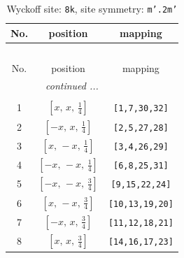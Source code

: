 \documentclass[fleqn,8pt]{jsarticle}
\begin{document}
\begin{longtable}{ccc}
\caption{Wyckoff site: {\tt 8k}, site symmetry: {\tt m'.2m'}}
 \\
 \hline \hline
No. & position & mapping \\ \hline \endfirsthead

\multicolumn{2}{l}{\tablename\ \thetable{}} \\
 \hline \hline
No. & position & mapping \\ \hline \endhead

 \hline \hline
\multicolumn{2}{r}{\footnotesize\it continued ...} \\ \endfoot

 \hline \hline
\multicolumn{2}{r}{} \\ \endlastfoot

1 & $\left[ x,\, x,\, \frac{1}{4} \right]$ & {\tt [1,7,30,32]} \\ \hline
2 & $\left[ - x,\, x,\, \frac{1}{4} \right]$ & {\tt [2,5,27,28]} \\ \hline
3 & $\left[ x,\, - x,\, \frac{1}{4} \right]$ & {\tt [3,4,26,29]} \\ \hline
4 & $\left[ - x,\, - x,\, \frac{1}{4} \right]$ & {\tt [6,8,25,31]} \\ \hline
5 & $\left[ - x,\, - x,\, \frac{3}{4} \right]$ & {\tt [9,15,22,24]} \\ \hline
6 & $\left[ x,\, - x,\, \frac{3}{4} \right]$ & {\tt [10,13,19,20]} \\ \hline
7 & $\left[ - x,\, x,\, \frac{3}{4} \right]$ & {\tt [11,12,18,21]} \\ \hline
8 & $\left[ x,\, x,\, \frac{3}{4} \right]$ & {\tt [14,16,17,23]} \\
\end{longtable}
\renewcommand{\arraystretch}{1.2}
\end{document}

